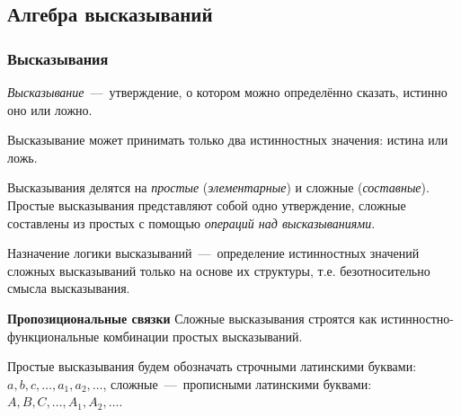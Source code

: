 \subsection{Алгебра высказываний}
\subsubsection{Высказывания}
\textit{Высказывание}~---~утверждение, о котором можно определённо сказать,
истинно оно или ложно.

Высказывание может принимать только два истинностных значения: истина или ложь.

Высказывания делятся на \textit{простые} (\textit{элементарные}) и сложные (\textit{составные}). Простые высказывания представляют собой одно утверждение, сложные составлены из простых с помощью \textit{операций над высказываниями}.

Назначение логики высказываний~---~определение истинностных значений сложных высказываний только на основе их структуры, т.е. безотносительно смысла высказывания.

\textbf{Пропозициональные связки}
Сложные высказывания строятся как истинностно-функциональные комбинации простых высказываний.

Простые высказывания будем обозначать строчными латинскими
буквами: $a, b, c, \dots, a_1, a_2, \dots$, сложные~---~прописными латинскими буквами: $A, B, C, \dots, A_1, A_2, \dots$.

